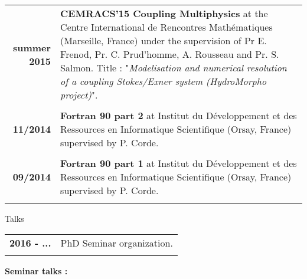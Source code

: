 \documentclass[10pt,a4paper]{report}
\begin{document}
\vspace{0.6cm}

\begin{center}
\begin{tabular}{r p{12cm}}
\textbf{summer 2015} & \textbf{CEMRACS'15 Coupling Multiphysics} at the Centre International de Rencontres Mathématiques (Marseille, France) under the supervision of Pr E. Frenod, Pr. C. Prud'homme, A. Rousseau and Pr. S. Salmon.\newline
Title : "\textit{Modelisation and numerical resolution of a coupling Stokes/Exner system (HydroMorpho project)}".\\

& \\

\textbf{11/2014} & \textbf{Fortran 90 part 2} at Institut du Développement et des Ressources en Informatique Scientifique (Orsay, France) supervised by P. Corde.\\

& \\

\textbf{09/2014} & \textbf{Fortran 90 part 1} at Institut du Développement et des Ressources en Informatique Scientifique (Orsay, France) supervised by P. Corde.\\

& \\

\end{tabular}
\end{center}


\vspace{1cm}
\noindent
{\selectfont
\begin{Large}
Talks
\end{Large}
\hrulefill
}

\vspace{0.6cm}
\noindent
\begin{center}
\begin{tabular}{r p{12cm}}
\textbf{2016 - ...} & PhD Seminar organization.\\

& \\

\end{tabular}
\end{center}


\vspace{0.4cm}
\noindent
{\selectfont
\textbf{Seminar talks :}
}
\end{document}
